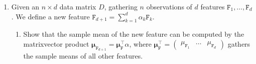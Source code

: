 \documentclass[letterpaper,10pt,english]{jupyterBook}
\begin{document}
\begin{enumerate}
\begin{sphinxuseclass}{toggle}
\sphinxAtStartPar
We have derived in the lecture that the sample variance of a feature defined by \(\mathtt{F}_{\alpha}= \alpha_1\mathtt{F}_1 + \ldots + \alpha_d\mathtt{F}_d\) is given by
\begin{align*}
   \sigma_{\mathtt{F}_{\alpha}}^2 = \frac1n\left\lVert \left(D -\vvec{1}{\bm \mu_\mathtt{F}^\top }\right){\bm\alpha}\right\rVert^2 = \frac1n\left\lVert C{\bm\alpha}\right\rVert^2. 
\end{align*}
\sphinxAtStartPar
If we choose now \(\alpha = V_{\cdot k}\), and insert the singular value decomposition of \(C=U\Sigma V^\top\), then we get
\begin{align*}
\sigma_{\mathtt{F}_{V_{\cdot k}}}^2 & = \frac1n\left\lVert C{V_{\cdot k}}\right\rVert^2\\
& = \frac1n\left\lVert U\Sigma V^\top {V_{\cdot k}}\right\rVert^2 \\
 & = \frac1n\left\lVert \Sigma V^\top {V_{\cdot k}}\right\rVert^2 & \text{(orthogonal invariance)}\\
 & = \frac1n\left\lVert \Sigma 
 \begin{pmatrix} V_{\cdot 1}^\top V_{\cdot k}\\
 \vdots\\
 V_{\cdot k}^\top V_{\cdot k}\\
 \vdots\\
 V_{\cdot 1}^\top V_{\cdot d}
 \end{pmatrix}\right\rVert^2 
 = \frac1n\left\lVert \Sigma \begin{pmatrix} 0\\
 \vdots\\
 1\\
 \vdots\\
 0
 \end{pmatrix}\right\rVert^2 \\
 &=\frac1n \sigma_k^2. &(\sigma_k = \Sigma_{kk})
\end{align*}
\end{sphinxuseclass}
\item {} 
\sphinxAtStartPar
Given an \(n\times d\) data matrix \(D\), gathering \(n\) observations of \(d\) features \(\mathtt{F}_1,\ldots,\mathtt{F}_d\). We define a new feature \(\displaystyle\mathtt{F}_{d+1}= \sum_{k=1}^d \alpha_k\mathtt{F}_k\).
\begin{enumerate}
%
\item {} 
\sphinxAtStartPar
Show that the sample mean of the new feature can be computed by the matrix\sphinxhyphen{}vector product \({\bm \mu_{\mathtt{F}_{d+1}}=\bm \mu_\mathtt{F}^\top \alpha}\), where \(\bm \mu_\mathtt{F}^\top = \begin{pmatrix}
\mu_{\mathtt{F}_1} &\ldots & \mu_{\mathtt{F}_d}\end{pmatrix}\) gathers the sample means of all other features.


\end{enumerate}
\end{enumerate}
\end{document}
